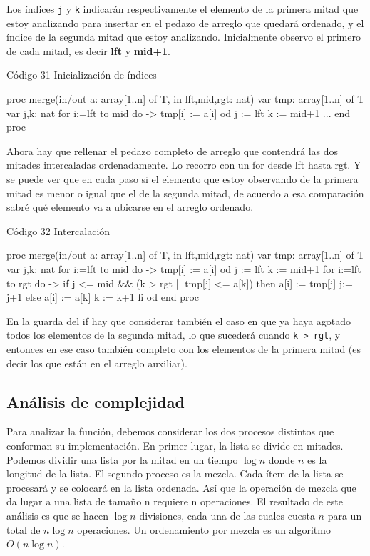 Los índices \texttt{j} y \texttt{k} indicarán respectivamente el elemento de la primera mitad que estoy analizando para insertar en el pedazo de arreglo que quedará ordenado, y el índice de la segunda mitad que estoy analizando. Inicialmente observo el primero de cada mitad, es decir \textbf{lft} y \textbf{mid+1}.
\begin{codebox}{Código 31}
\footnotesize Inicialización de índices
\tcblower
\begin{pascallike}
proc merge(in/out a: array[1..n] of T, in lft,mid,rgt: nat)
    var tmp: array[1..n] of T
    var j,k: nat
    for i:=lft to mid do ->
        tmp[i] := a[i] 
    od
    j := lft
    k := mid+1
    ...
end proc
\end{pascallike}
\end{codebox}
Ahora hay que rellenar el pedazo completo de arreglo que contendrá las dos mitades intercaladas ordenadamente. Lo recorro con un for desde lft hasta rgt. Y se puede ver que en cada paso si el elemento que estoy observando de la primera mitad es menor o igual que el de la segunda mitad, de acuerdo a esa comparación sabré qué elemento va a ubicarse en el arreglo ordenado.
\begin{codebox}{Código 32}
\footnotesize Intercalación
\tcblower
\begin{pascallike}
proc merge(in/out a: array[1..n] of T, in lft,mid,rgt: nat)
    var tmp: array[1..n] of T
    var j,k: nat
    for i:=lft to mid do ->
        tmp[i] := a[i] 
    od
    j := lft
    k := mid+1
    for i:=lft to rgt do ->
        if j <= mid && (k > rgt || tmp[j] <= a[k])
            then a[i] := tmp[j]
                j:= j+1
            else a[i] := a[k]
                k := k+1
        fi
    od
end proc
\end{pascallike}
\end{codebox}
En la guarda del if hay que considerar también el caso en que ya haya agotado todos los elementos de la segunda mitad, lo que sucederá cuando \texttt{k > rgt}, y entonces en ese caso también completo con los elementos de la primera mitad (es decir los que están en el arreglo auxiliar).

\subsection{Análisis de complejidad}
Para analizar la función, debemos considerar los dos procesos distintos que conforman su implementación. En primer lugar, la lista se divide en mitades. Podemos dividir una lista por la mitad en un tiempo $\log n$ donde $n$ es la longitud de la lista. El segundo proceso es la mezcla. Cada ítem de la lista se procesará y se colocará en la lista ordenada. Así que la operación de mezcla que da lugar a una lista de tamaño n requiere n operaciones. El resultado de este análisis es que se hacen $\log n$ divisiones, cada una de las cuales cuesta $n$ para un total de $n\log n$ operaciones. Un ordenamiento por mezcla es un algoritmo $O(n \log n)$.

